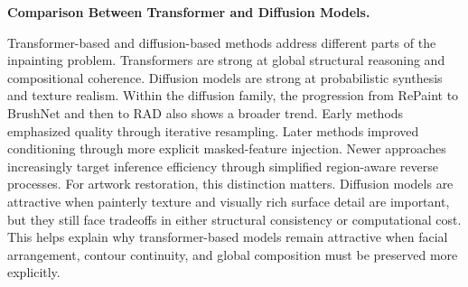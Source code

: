 \documentclass[12pt, twoside]{report}
\begin{document}
\medskip
\noindent\textbf{Comparison Between Transformer and Diffusion Models.}

Transformer-based and diffusion-based methods address different parts of the inpainting problem. Transformers are strong at global structural reasoning and compositional coherence. Diffusion models are strong at probabilistic synthesis and texture realism. Within the diffusion family, the progression from RePaint to BrushNet and then to RAD also shows a broader trend. Early methods emphasized quality through iterative resampling. Later methods improved conditioning through more explicit masked-feature injection. Newer approaches increasingly target inference efficiency through simplified region-aware reverse processes. For artwork restoration, this distinction matters. Diffusion models are attractive when painterly texture and visually rich surface detail are important, but they still face tradeoffs in either structural consistency or computational cost. This helps explain why transformer-based models remain attractive when facial arrangement, contour continuity, and global composition must be preserved more explicitly.
\end{document}
